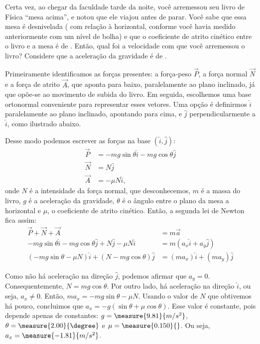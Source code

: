 \begin{question}
	Certa vez, ao chegar da faculdade tarde da noite, você arremessou seu livro de Física ``mesa acima'', e notou que ele viajou  antes de parar.
	Você sabe que essa mesa é desnivelada ( com relação à horizontal, conforme você havia medido anteriormente com um nível de bolha) e que o coeficiente de atrito cinético entre o livro e a mesa é de .
	Então, qual foi a velocidade com que você arremessou o livro?
	Considere que a aceleração da gravidade é de .

	\begin{answer}
	\end{answer}

	\begin{solution}
		Primeiramente identificamos as forças presentes: a força-peso $\vec P$, a força normal $\vec N$ e a força de atrito $\vec A$, que aponta para baixo, paralelamente ao plano inclinado, já que opõe-se ao movimento de subida do livro.
		Em seguida, escolhemos uma base ortonormal conveniente para representar esses vetores.
		Uma opção é definirmos $\hat i$ paralelamente ao plano inclinado, apontando para cima, e $\hat j$ perpendicularmente a $\hat i$, como ilustrado abaixo.


		Desse modo podemos escrever as forças na base $(\hat i, \hat j)$:
		\begin{align*}
			\vec P &= -mg\sin\theta\hat i - mg\cos\theta\hat j \\
			\vec N &= N\hat j \\
			\vec A &= -\mu N \hat i,
		\end{align*}
		onde $N$ é a intensidade da força normal, que desconhecemos, $m$ é a massa do livro, $g$ é a aceleração da gravidade, $\theta$ é o ângulo entre o plano da mesa a horizontal e $\mu$, o coeficiente de atrito cinético.
		Então, a segunda lei de Newton fica assim:
		\begin{align*}
			\vec P + \vec N + \vec A &= m \vec a \\
			-mg\sin\theta\hat i - mg\cos\theta\hat j + N\hat j -\mu N \hat i &= m (a_x \hat i + a_y \hat j) \\
			(-mg\sin\theta - \mu N) \hat i + (N  - mg\cos\theta)\hat j &= (m a_x)\hat i + (m a_y) \hat j
		\end{align*}

		Como não há aceleração na direção $\hat j$, podemos afirmar que $a_y = 0$.
		Consequentemente, $N = mg\cos\theta$.
		Por outro lado, há aceleração na direção $\hat i$, ou seja, $a_x \ne 0$.
		Então, $ma_x = -mg\sin\theta - \mu N$.
		Usando o valor de $N$ que obtivemos há pouco, concluimos que $a_x = -g(\sin\theta + \mu \cos\theta)$.
		Esse valor é constante, pois depende apenas de constantes: $g = \measure{9.81}{m/s^2}$, $\theta = \measure{2.00}{\degree}$ e $\mu = \measure{0.150}{}$.
		Ou seja, $a_x = \measure{-1.81}{m/s^2}$.


\end{solution}
\end{question}
